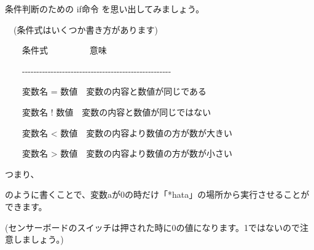 条件判断のための if命令 を思い出してみましょう。


\begin{description}
    \item {}
    \item {}
    \item {}
    \item {}
\end{description}


\ \ (条件式はいくつか書き方があります)


\ \ \ \ 条件式 \ \ \ \ \ \ \ \ \ 意味

\ \ \ \ {}-{}-{}-{}-{}-{}-{}-{}-{}-{}-{}-{}-{}-{}-{}-{}-{}-{}-{}-{}-{}-{}-{}-{}-{}-{}-{}-{}-{}-{}-{}-{}-{}-{}-{}-{}-{}-{}-{}-{}-{}-{}-{}-{}-{}-{}-{}-{}-{}-{}-{}-{}-

\ \ \ \ 変数名 =
数値\ \ 変数の内容と数値が同じである

\ \ \ \ 変数名 !
数値\ \ 変数の内容と数値が同じではない

\ \ \ \ 変数名 {\textless}
数値\ \ 変数の内容より数値の方が数が大きい

\ \ \ \ 変数名 {\textgreater}
数値\ \ 変数の内容より数値の方が数が小さい


つまり、


\begin{description}
    \item {}
    \item {}
\end{description}


のように書くことで、変数aが0の時だけ「*hata」の場所から実行させることができます。

(センサーボードのスイッチは押された時に0の値になります。1ではないので注意しましょう。)
